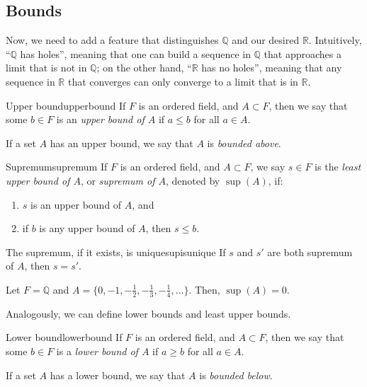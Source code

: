 
\subsection{Bounds}

Now, we need to add a feature that distinguishes \(\mathbb{Q}\) and our desired \(\mathbb{R}\).
Intuitively, ``\(\mathbb{Q}\) has holes'', meaning that one can build a sequence in \(\mathbb{Q}\) that approaches a limit that is not in \(\mathbb{Q}\); on the other hand, ``\(\mathbb{R}\) has no holes'', meaning that any sequence in \(\mathbb{R}\) that converges can only converge to a limit that is in \(\mathbb{R}\).

\begin{defn}{Upper bound}{upperbound}
	If \(F\) is an ordered field, and \(A \subset F\), then we say that some \(b \in F\) is an \emph{upper bound of \(A\) } if \(a \leq b\) for all \(a \in A\).

	If a set \(A\) has an upper bound, we say that \(A\) is \emph{bounded above}.
\end{defn}

\begin{defn}{Supremum}{supremum}
	If \(F\) is an ordered field, and \(A \subset F\), we say \(s \in F\) is the \emph{least upper bound of \(A\)}, or \emph{supremum of \(A\)}, denoted by \(\sup(A)\), if:
	\begin{enumerate}
		\item \(s\) is an upper bound of \(A\), and
		\item if \(b\) is any upper bound of \(A\), then \(s \leq b\).
	\end{enumerate}
\end{defn}

\begin{prop}{The supremum, if it exists, is unique}{supisunique}
	If \(s\) and \(s'\) are both supremum of \(A\), then \(s = s'\).
\end{prop}

\begin{exmp}{}{}
	Let \(F = \mathbb{Q}\) and \(A = \{0, -1, -\frac{1}{2}, -\frac{1}{3}, -\frac{1}{4}, \dots\}\). Then,  \(\sup(A) = 0\).
\end{exmp}

Analogously, we can define lower bounds and least upper bounds.

\begin{defn}{Lower bound}{lowerbound}
	If \(F\) is an ordered field, and \(A \subset F\), then we say that some \(b \in F\) is a \emph{lower bound of \(A\) } if \(a \geq b\) for all \(a \in A\).

	If a set \(A\) has a lower bound, we say that \(A\) is \emph{bounded below}.
\end{defn}

